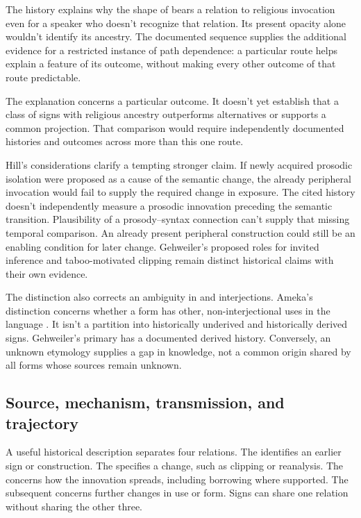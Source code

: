 \documentclass[12pt]{article}
\begin{document}
The history explains why the shape of  bears a relation
to religious invocation even for a speaker who doesn't recognize that
relation. Its present opacity alone wouldn't identify its ancestry.
The documented sequence supplies the additional evidence for a
restricted instance of path dependence: a particular route helps explain
a feature of its outcome, without making every other outcome of that
route predictable.

The explanation concerns a particular outcome. It doesn't yet establish
that a class of signs with religious ancestry outperforms alternatives
or supports a common projection. That comparison would require independently
documented histories and outcomes across more than this one route.

Hill's considerations clarify a tempting stronger claim. If newly acquired
prosodic isolation were proposed as a cause of the semantic change, the
already peripheral invocation would fail to supply the required change
in exposure. The cited history doesn't independently measure a prosodic
innovation preceding the semantic transition. Plausibility of a
prosody--syntax connection can't supply that missing temporal comparison.
An already present peripheral construction could still be an enabling
condition for later change.
Gehweiler's proposed roles for invited inference and taboo-motivated
clipping remain distinct historical claims with their own evidence.

The distinction also corrects an ambiguity in  and
 interjections. Ameka's distinction concerns whether
a form has other, non-interjectional uses in the language
\citep[105--106]{ameka1992}. It isn't a partition into historically
underived and historically derived signs. Gehweiler's primary
 has a documented derived history. Conversely, an unknown
etymology supplies a gap in knowledge, not a common origin shared by
all forms whose sources remain unknown.

\subsection{Source, mechanism, transmission, and trajectory}

A useful historical description separates four relations. The
 identifies an earlier sign or construction. The
 specifies a change, such as clipping or reanalysis.
The  concerns how the innovation spreads,
including borrowing where supported. The subsequent 
concerns further changes in use or form. Signs can share one relation
without sharing the other three.
\end{document}
